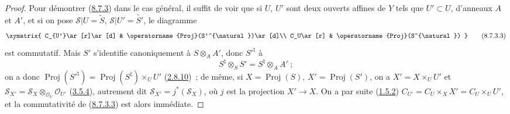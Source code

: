 \begin{proof}
Pour démontrer (\hyperref[II.8.7.3-fr]{8.7.3}) dans le cas général, il suffit
de voir que si $U$, $U'$ sont deux ouverts affines de $Y$ tels que
$U'\subset U$, d'anneaux $A$ et $A'$, et si on pose
$\mathcal{S}|U=\widetilde{S}$, $\mathcal{S}|U'=\widetilde{S'}$, le diagramme
\begin{equation}
\label{II.8.7.3.3-fr}
  \xymatrix{
    C_{U'}\ar[r]\ar[d] & \operatorname{Proj}(S'^{\natural})\ar[d]\\
    C_U\ar[r] & \operatorname{Proj}(S^{\natural})
  }
\tag{8.7.3.3}
\end{equation}
est commutatif. Mais $S'$ s'identifie canoniquement à $S\otimes_A A'$, donc
$S'^{\natural}$ à
\[
  S^{\natural}\otimes_S S'=S^{\natural}\otimes_A A'~;
\]
on a donc
$\operatorname{Proj}(S'^{\natural})=\operatorname{Proj}(S^{\natural})
\times_U U'$ (\hyperref[II.2.8.10-fr]{2.8.10})~; de même, si
$X=\operatorname{Proj}(S)$, $X'=\operatorname{Proj}(S')$, on a
$X'=X\times_U U'$ et
$\mathcal{S}_{X'}=\mathcal{S}_X\otimes_{\mathcal{O}_U}\mathcal{O}_{U'}$
(\hyperref[II.3.5.4-fr]{3.5.4}), autrement dit
$\mathcal{S}_{X'}=j^*(\mathcal{S}_X)$, où $j$ est la projection $X'\to X$.
On a par suite (\hyperref[II.1.5.2-fr]{1.5.2})
$C_{U'}=C_U\times_X X'=C_U\times_U U'$, et la commutativité de
(\hyperref[II.8.7.3.3-fr]{8.7.3.3}) est alors immédiate.
\end{proof}

